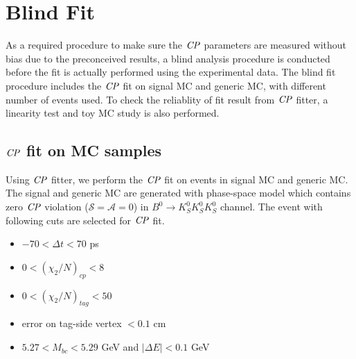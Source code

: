 \section{Blind Fit}
As a required procedure to make sure the $\it{CP}$ parameters are measured without bias due to the preconceived results, a blind analysis procedure is conducted before the fit is actually performed using the experimental data. The blind fit procedure includes the $\it{CP}$ fit on signal MC and generic MC, with different number of events used. To check the reliablity of fit result from $\it{CP}$ fitter, a linearity test and toy MC study is also performed. 

\subsection{$\it{CP}$ fit on MC samples}
Using $\it{CP}$ fitter, we perform the $\it{CP}$ fit on events in signal MC and generic MC.
The signal and generic MC are generated with phase-space model which contains zero $\it{CP}$ violation ($\mathcal{S}=\mathcal{A}=0$) in $B^0 \to K_S^0  K_S^0  K_S^0$ channel. 
The event with following cuts are selected for $\it{CP}$ fit. 
\begin{itemize}
	\item $-70 < \Delta t < 70$ ps
	\item $0 < (\chi_2/N)_{cp} < 8 $
	\item $0 < (\chi_2/N)_{tag} < 50 $
	\item error on tag-side vertex $< 0.1 $ cm
	\item $5.27 < M_{bc} < 5.29$ GeV and $|\Delta E| < 0.1$ GeV
\end{itemize}

